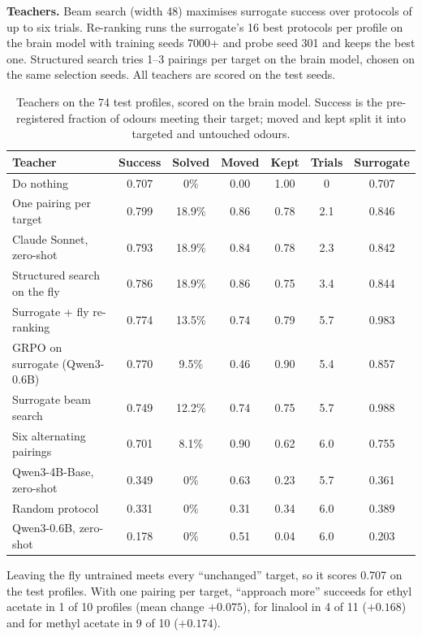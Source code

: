 \textbf{Teachers.} Beam search (width 48) maximises surrogate success over protocols of up to six trials. Re-ranking runs the surrogate's 16 best protocols per profile on the brain model with training seeds 7000+ and probe seed 301 and keeps the best one. Structured search tries 1--3 pairings per target on the brain model, chosen on the same selection seeds. All teachers are scored on the test seeds.

\begin{table}[h]
\centering
\caption{Teachers on the 74 test profiles, scored on the brain model. Success is the pre-registered fraction of odours meeting their target; moved and kept split it into targeted and untouched odours.}
\label{tab:teach}
\small
\begin{tabular}{lcccccc}
\toprule
Teacher & Success & Solved & Moved & Kept & Trials & Surrogate \\
\midrule
Do nothing & 0.707 & 0\% & 0.00 & 1.00 & 0 & 0.707 \\
One pairing per target & 0.799 & 18.9\% & 0.86 & 0.78 & 2.1 & 0.846 \\
Claude Sonnet, zero-shot & 0.793 & 18.9\% & 0.84 & 0.78 & 2.3 & 0.842 \\
Structured search on the fly & 0.786 & 18.9\% & 0.86 & 0.75 & 3.4 & 0.844 \\
Surrogate + fly re-ranking & 0.774 & 13.5\% & 0.74 & 0.79 & 5.7 & 0.983 \\
GRPO on surrogate (Qwen3-0.6B) & 0.770 & 9.5\% & 0.46 & 0.90 & 5.4 & 0.857 \\
Surrogate beam search & 0.749 & 12.2\% & 0.74 & 0.75 & 5.7 & 0.988 \\
Six alternating pairings & 0.701 & 8.1\% & 0.90 & 0.62 & 6.0 & 0.755 \\
Qwen3-4B-Base, zero-shot & 0.349 & 0\% & 0.63 & 0.23 & 5.7 & 0.361 \\
Random protocol & 0.331 & 0\% & 0.31 & 0.34 & 6.0 & 0.389 \\
Qwen3-0.6B, zero-shot & 0.178 & 0\% & 0.51 & 0.04 & 6.0 & 0.203 \\
\bottomrule
\end{tabular}
\end{table}

Leaving the fly untrained meets every ``unchanged'' target, so it scores 0.707 on the test profiles. With one pairing per target, ``approach more'' succeeds for ethyl acetate in 1 of 10 profiles (mean change $+0.075$), for linalool in 4 of 11 ($+0.168$) and for methyl acetate in 9 of 10 ($+0.174$).

